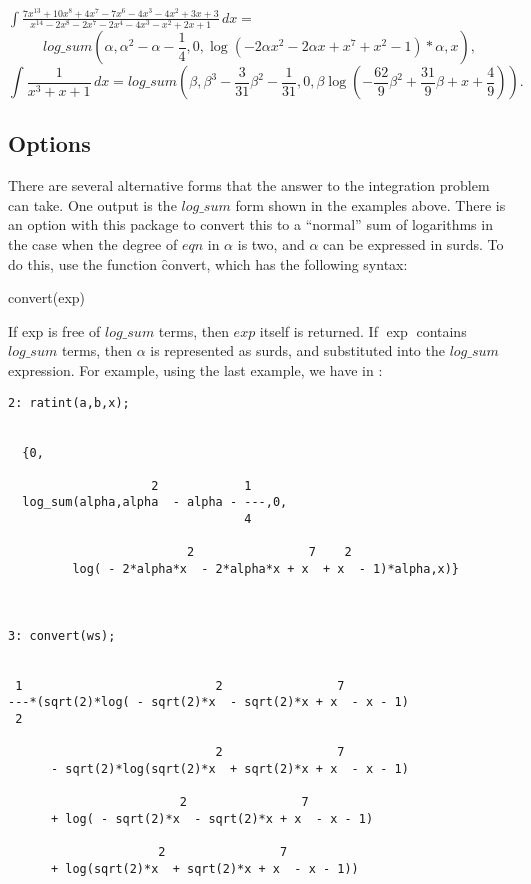 \(
\displaystyle
\int \frac{7x^{13}+10x^8+4x^7-7x^6-4x^3-4x^2+3x+3}{x^{14}-2x^8-2x^7-2x^4-4x^3-x^2+2x+1} \, dx  =
\)
\[
log\_sum(\alpha,\alpha^2  -\alpha -\frac{1}{4},0,\log( - 2\alpha x^2  - 2\alpha x + x^7  + x^2  - 1)*\alpha,x) ,
\]
\[ \int \frac{1}{x^3+x+1} \, dx = log\_sum(\beta,\beta^3-\frac{3}{31}\beta^2-\frac{1}{31},0,\beta \log(-\frac{62}{9}\beta^2+\frac{31}{9} \beta +x+\frac{4}{9})). \]

\subsection{Options}
There are several alternative forms that the answer to the integration problem can take. One output is the $log\_sum$ form shown in the examples above. There is an option with this package to convert this to a ``normal'' sum of logarithms in the case when the degree of $eqn$ in $\alpha$ is two, and $\alpha$ can be expressed in surds. To do this, use the function \f{convert}, which has the following syntax:
\begin{center}  convert(exp) \end{center}
If exp is free of $log\_sum$ terms, then $exp$ itself is returned. If $\exp$ contains $log\_sum$ terms, then $\alpha$ is represented as surds, and substituted into the $log\_sum$ expression. For example, using the last example, we have in \REDUCE:
\begin{verbatim}
2: ratint(a,b,x);


  {0,

                    2            1
  log_sum(alpha,alpha  - alpha - ---,0,
                                 4

                         2                7    2
         log( - 2*alpha*x  - 2*alpha*x + x  + x  - 1)*alpha,x)}



3: convert(ws);


 1                           2                7
---*(sqrt(2)*log( - sqrt(2)*x  - sqrt(2)*x + x  - x - 1)
 2

                             2                7
      - sqrt(2)*log(sqrt(2)*x  + sqrt(2)*x + x  - x - 1)

                        2                7
      + log( - sqrt(2)*x  - sqrt(2)*x + x  - x - 1)

                     2                7
      + log(sqrt(2)*x  + sqrt(2)*x + x  - x - 1))
\end{verbatim}

